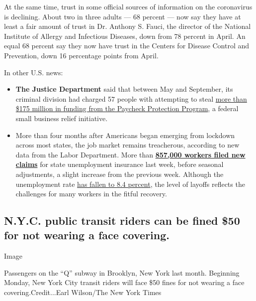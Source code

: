 At the same time, trust in some official sources of information on the
coronavirus is declining. About two in three adults --- 68 percent ---
now say they have at least a fair amount of trust in Dr. Anthony S.
Fauci, the director of the National Institute of Allergy and Infectious
Diseases, down from 78 percent in April. An equal 68 percent say they
now have trust in the Centers for Disease Control and Prevention, down
16 percentage points from April.

In other U.S. news:

\begin{itemize}
\item
  \textbf{The Justice Department} said that between May and September,
  its criminal division had charged 57 people with attempting to steal
  \href{https://www.nytimes3xbfgragh.onion/2020/09/10/us/politics/ppp-fraud-coronavirus.html}{more
  than \$175 million in funding from the Paycheck Protection Program}, a
  federal small business relief initiative.
\item
  More than four months after Americans began emerging from lockdown
  across most states, the job market remains treacherous, according to
  new data from the Labor Department. More than
  \textbf{\href{https://www.nytimes3xbfgragh.onion/2020/09/10/business/economy/unemployment-claims.html?searchResultPosition=1}{857,000
  workers filed new claims}} for state unemployment insurance last week,
  before seasonal adjustments, a slight increase from the previous week.
  Although the unemployment rate
  \href{https://www.nytimes3xbfgragh.onion/2020/09/04/business/economy/jobs-report.html}{has
  fallen to 8.4 percent}, the level of layoffs reflects the challenges
  for many workers in the fitful recovery.
\end{itemize}

\hypertarget{nyc-public-transit-riders-can-be-fined-50-for-not-wearing-a-face-covering}{%
\subsection{N.Y.C. public transit riders can be fined \$50 for not
wearing a face
covering.}\label{nyc-public-transit-riders-can-be-fined-50-for-not-wearing-a-face-covering}}

Image

Passengers on the ``Q'' subway in Brooklyn, New York last month.
Beginning Monday, New York City transit riders will face \$50 fines for
not wearing a face covering.Credit...Earl Wilson/The New York Times

